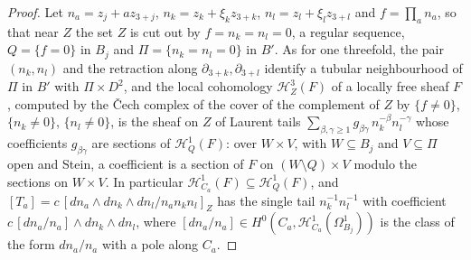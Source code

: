 \documentclass[11pt,reqno]{amsart}
\numberwithin{equation}{section}
\theoremstyle{plain}
\theoremstyle{definition}
\begin{document}
\begin{proof}
Let $n_{a}=z_{j}+az_{3+j}$, $n_{k}=z_{k}+\xi_{k}z_{3+k}$, $n_{l}=z_{l}+\xi_{l}z_{3+l}$ and $f=\prod_{a}n_{a}$, so that near $Z$ the set $Z$ is cut out by $f=n_{k}=n_{l}=0$, a regular sequence, $Q=\{f=0\}$ in $B_{j}$ and $\Pi=\{n_{k}=n_{l}=0\}$ in $B'$. As for one threefold, the pair $(n_{k},n_{l})$ and the retraction along $\partial_{3+k},\partial_{3+l}$ identify a tubular neighbourhood of $\Pi$ in $B'$ with $\Pi\times D^{2}$, and the local cohomology $\mathcal{H}^{3}_{Z}(F)$ of a locally free sheaf $F$, computed by the \v{C}ech complex of the cover of the complement of $Z$ by $\{f\ne0\}$, $\{n_{k}\ne0\}$, $\{n_{l}\ne0\}$, is the sheaf on $Z$ of Laurent tails $\sum_{\beta,\gamma\ge1}g_{\beta\gamma}\,n_{k}^{-\beta}n_{l}^{-\gamma}$ whose coefficients $g_{\beta\gamma}$ are sections of $\mathcal{H}^{1}_{Q}(F)$: over $W\times V$, with $W\subseteq B_{j}$ and $V\subseteq\Pi$ open and Stein, a coefficient is a section of $F$ on $(W\setminus Q)\times V$ modulo the sections on $W\times V$. In particular $\mathcal{H}^{1}_{C_{a}}(F)\subseteq\mathcal{H}^{1}_{Q}(F)$, and $[T_{a}]=c\,[dn_{a}\wedge dn_{k}\wedge dn_{l}/n_{a}n_{k}n_{l}]_{Z}$ has the single tail $n_{k}^{-1}n_{l}^{-1}$ with coefficient $c\,[dn_{a}/n_{a}]\wedge dn_{k}\wedge dn_{l}$, where $[dn_{a}/n_{a}]\in H^{0}(C_{a},\mathcal{H}^{1}_{C_{a}}(\Omega^{1}_{B_{j}}))$ is the class of the form $dn_{a}/n_{a}$ with a pole along $C_{a}$.


\end{proof}
\end{document}
